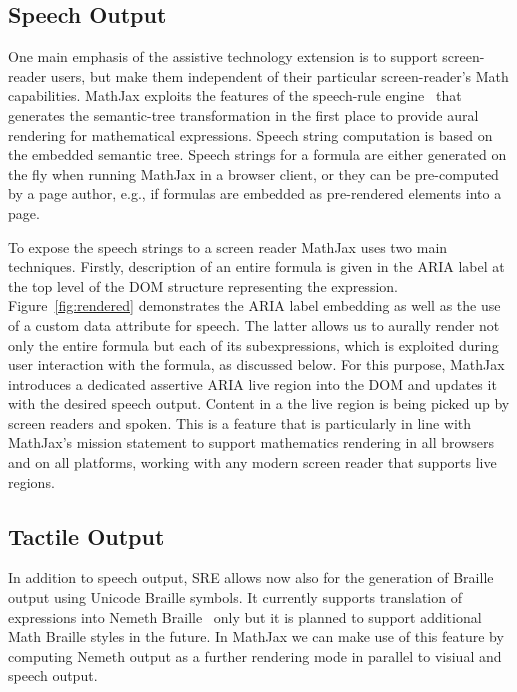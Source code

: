 \documentclass{sig-alternate}
\begin{document}
\subsection{Speech Output}

One main emphasis of the assistive technology extension is to support
screen-reader users, but make them independent of their particular
screen-reader's Math capabilities. MathJax exploits the features of the
speech-rule engine~\cite{Sorge14,SRE-release-3} that generates the semantic-tree
transformation in the first place to provide aural rendering for mathematical
expressions. Speech string computation is based on the embedded semantic
tree. Speech strings for a formula are either generated on the fly when running
MathJax in a browser client, or they can be pre-computed by a page author, e.g.,
if formulas are embedded as pre-rendered elements into a page.

To expose the speech strings to a screen reader MathJax uses two main
techniques.  Firstly, description of an entire formula is given in the ARIA
label at the top level of the DOM structure representing the expression.
Figure~\ref{fig:rendered} demonstrates the ARIA label embedding as well as the
use of a custom data attribute for speech. The latter allows us to aurally
render not only the entire formula but each of its subexpressions, which is
exploited during user interaction with the formula, as discussed below.  For
this purpose, MathJax introduces a dedicated assertive ARIA live region into the
DOM and updates it with the desired speech output. Content in a the live region
is being picked up by screen readers and spoken. This is a feature that is
particularly in line with MathJax's mission statement to support mathematics
rendering in all browsers and on all platforms, working with any modern screen
reader that supports live regions.


\subsection{Tactile Output}

In addition to speech output, SRE allows now also for the generation of Braille
output using Unicode Braille symbols. It currently supports translation of
expressions into Nemeth Braille~\cite{nemeth} only but it is planned to support
additional Math Braille styles in the future. In MathJax we can make use of this
feature by computing Nemeth output as a further rendering mode in parallel to
visiual and speech output.
\end{document}
